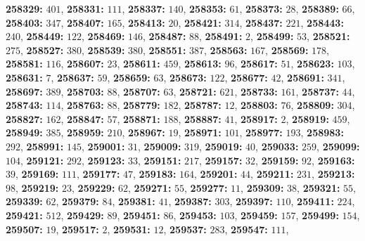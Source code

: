 \textsf{\bfseries 258329:} $401$, \textsf{\bfseries 258331:} $111$, \textsf{\bfseries 258337:} $140$, \textsf{\bfseries 258353:} $61$, \textsf{\bfseries 258373:} $28$, \textsf{\bfseries 258389:} $66$, \textsf{\bfseries 258403:} $347$, \textsf{\bfseries 258407:} $165$, \textsf{\bfseries 258413:} $20$, \textsf{\bfseries 258421:} $314$, \textsf{\bfseries 258437:} $221$, \textsf{\bfseries 258443:} $240$, \textsf{\bfseries 258449:} $122$, \textsf{\bfseries 258469:} $146$, \textsf{\bfseries 258487:} $88$, \textsf{\bfseries 258491:} $2$, \textsf{\bfseries 258499:} $53$, \textsf{\bfseries 258521:} $275$, \textsf{\bfseries 258527:} $380$, \textsf{\bfseries 258539:} $380$, \textsf{\bfseries 258551:} $387$, \textsf{\bfseries 258563:} $167$, \textsf{\bfseries 258569:} $178$, \textsf{\bfseries 258581:} $116$, \textsf{\bfseries 258607:} $23$, \textsf{\bfseries 258611:} $459$, \textsf{\bfseries 258613:} $96$, \textsf{\bfseries 258617:} $51$, \textsf{\bfseries 258623:} $103$, \textsf{\bfseries 258631:} $7$, \textsf{\bfseries 258637:} $59$, \textsf{\bfseries 258659:} $63$, \textsf{\bfseries 258673:} $122$, \textsf{\bfseries 258677:} $42$, \textsf{\bfseries 258691:} $341$, \textsf{\bfseries 258697:} $389$, \textsf{\bfseries 258703:} $88$, \textsf{\bfseries 258707:} $63$, \textsf{\bfseries 258721:} $621$, \textsf{\bfseries 258733:} $161$, \textsf{\bfseries 258737:} $44$, \textsf{\bfseries 258743:} $114$, \textsf{\bfseries 258763:} $88$, \textsf{\bfseries 258779:} $182$, \textsf{\bfseries 258787:} $12$, \textsf{\bfseries 258803:} $76$, \textsf{\bfseries 258809:} $304$, \textsf{\bfseries 258827:} $162$, \textsf{\bfseries 258847:} $57$, \textsf{\bfseries 258871:} $188$, \textsf{\bfseries 258887:} $41$, \textsf{\bfseries 258917:} $2$, \textsf{\bfseries 258919:} $459$, \textsf{\bfseries 258949:} $385$, \textsf{\bfseries 258959:} $210$, \textsf{\bfseries 258967:} $19$, \textsf{\bfseries 258971:} $101$, \textsf{\bfseries 258977:} $193$, \textsf{\bfseries 258983:} $292$, \textsf{\bfseries 258991:} $145$, \textsf{\bfseries 259001:} $31$, \textsf{\bfseries 259009:} $319$, \textsf{\bfseries 259019:} $40$, \textsf{\bfseries 259033:} $259$, \textsf{\bfseries 259099:} $104$, \textsf{\bfseries 259121:} $292$, \textsf{\bfseries 259123:} $33$, \textsf{\bfseries 259151:} $217$, \textsf{\bfseries 259157:} $32$, \textsf{\bfseries 259159:} $92$, \textsf{\bfseries 259163:} $39$, \textsf{\bfseries 259169:} $111$, \textsf{\bfseries 259177:} $47$, \textsf{\bfseries 259183:} $164$, \textsf{\bfseries 259201:} $44$, \textsf{\bfseries 259211:} $231$, \textsf{\bfseries 259213:} $98$, \textsf{\bfseries 259219:} $23$, \textsf{\bfseries 259229:} $62$, \textsf{\bfseries 259271:} $55$, \textsf{\bfseries 259277:} $11$, \textsf{\bfseries 259309:} $38$, \textsf{\bfseries 259321:} $55$, \textsf{\bfseries 259339:} $62$, \textsf{\bfseries 259379:} $84$, \textsf{\bfseries 259381:} $41$, \textsf{\bfseries 259387:} $303$, \textsf{\bfseries 259397:} $110$, \textsf{\bfseries 259411:} $224$, \textsf{\bfseries 259421:} $512$, \textsf{\bfseries 259429:} $89$, \textsf{\bfseries 259451:} $86$, \textsf{\bfseries 259453:} $103$, \textsf{\bfseries 259459:} $157$, \textsf{\bfseries 259499:} $154$, \textsf{\bfseries 259507:} $19$, \textsf{\bfseries 259517:} $2$, \textsf{\bfseries 259531:} $12$, \textsf{\bfseries 259537:} $283$, \textsf{\bfseries 259547:} $111$, 
